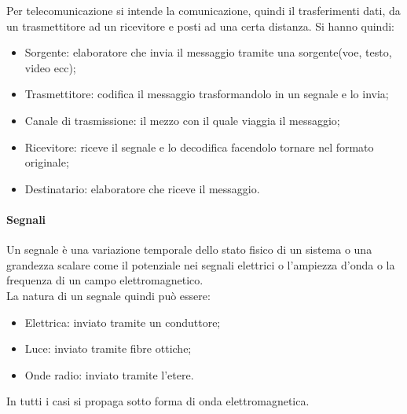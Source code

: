 \documentclass{subfiles}
\begin{document}
    Per telecomunicazione si intende la comunicazione, quindi il trasferimenti dati, da un trasmettitore ad un ricevitore e posti ad 
    una certa distanza. Si hanno quindi:
    \begin{itemize}
        \item Sorgente: elaboratore che invia il messaggio tramite una sorgente(voe, testo, video ecc);
        \item Trasmettitore: codifica il messaggio trasformandolo in un segnale e lo invia;
        \item Canale di trasmissione: il mezzo con il quale viaggia il messaggio;
        \item Ricevitore: riceve il segnale e lo decodifica facendolo tornare nel formato originale;
        \item Destinatario: elaboratore che riceve il messaggio.
    \end{itemize}

    \paragraph*{Segnali}
    \noindent Un segnale è una variazione temporale dello stato fisico di un sistema o una grandezza scalare come il potenziale nei segnali 
    elettrici o l'ampiezza d'onda o la frequenza di un campo elettromagnetico.\\
    La natura di un segnale quindi può essere:
    \begin{itemize}
        \item Elettrica: inviato tramite un conduttore;
        \item Luce: inviato tramite fibre ottiche;
        \item Onde radio: inviato tramite l'etere.
    \end{itemize}
    In tutti i casi si propaga sotto forma di onda elettromagnetica.
\end{document}
